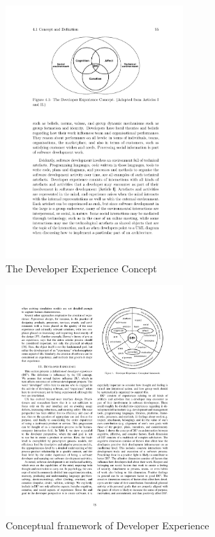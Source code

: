 \documentclass[english, 12pt, a4paper, sci, utf8, a-1b, online]{aaltothesis}
\begin{document}

\begin{figure}
  \captionsetup{width=0.6\textwidth}
  \caption{The Developer Experience Concept \citep{fagerholm-doctoral-thesis}}
  \begin{center}
    \includegraphics[width=0.6\textwidth]{dx-social-technical.pdf}
  \end{center}
  \label{figure:social-technical}
\end{figure}

\begin{figure}
  \captionsetup{width=0.6\textwidth}
  \caption{Conceptual framework of Developer Experience \citep{fagerholm-dx-concept-and-definition}}
  \begin{center}
    \includegraphics[width=0.6\textwidth]{dx-conceptual.pdf}
  \end{center}
  \label{figure:conceptual-framework}
\end{figure}
\end{document}

